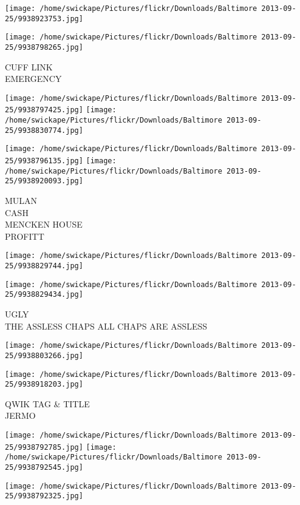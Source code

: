 \documentclass[10pt,letterpaper]{article}
\begin{document}
\texttt{[image: /home/swickape/Pictures/flickr/Downloads/Baltimore 2013-09-25/9938923753.jpg]}

\vspace{0.25in}
\texttt{[image: /home/swickape/Pictures/flickr/Downloads/Baltimore 2013-09-25/9938798265.jpg]}

CUFF LINK\\
EMERGENCY
\pagebreak

\texttt{[image: /home/swickape/Pictures/flickr/Downloads/Baltimore 2013-09-25/9938797425.jpg]}
\texttt{[image: /home/swickape/Pictures/flickr/Downloads/Baltimore 2013-09-25/9938830774.jpg]}

\texttt{[image: /home/swickape/Pictures/flickr/Downloads/Baltimore 2013-09-25/9938796135.jpg]}
\texttt{[image: /home/swickape/Pictures/flickr/Downloads/Baltimore 2013-09-25/9938920093.jpg]}

MULAN\\
CASH\\
MENCKEN HOUSE\\
PROFITT
\pagebreak

\texttt{[image: /home/swickape/Pictures/flickr/Downloads/Baltimore 2013-09-25/9938829744.jpg]}

\vspace{0.25in}
\texttt{[image: /home/swickape/Pictures/flickr/Downloads/Baltimore 2013-09-25/9938829434.jpg]}

UGLY\\
THE ASSLESS CHAPS ALL CHAPS ARE ASSLESS
\pagebreak

\texttt{[image: /home/swickape/Pictures/flickr/Downloads/Baltimore 2013-09-25/9938803266.jpg]}

\vspace{0.25in}
\texttt{[image: /home/swickape/Pictures/flickr/Downloads/Baltimore 2013-09-25/9938918203.jpg]}

QWIK TAG \& TITLE\\
JERMO
\pagebreak

\texttt{[image: /home/swickape/Pictures/flickr/Downloads/Baltimore 2013-09-25/9938792785.jpg]}
\texttt{[image: /home/swickape/Pictures/flickr/Downloads/Baltimore 2013-09-25/9938792545.jpg]}

\texttt{[image: /home/swickape/Pictures/flickr/Downloads/Baltimore 2013-09-25/9938792325.jpg]}
\end{document}
